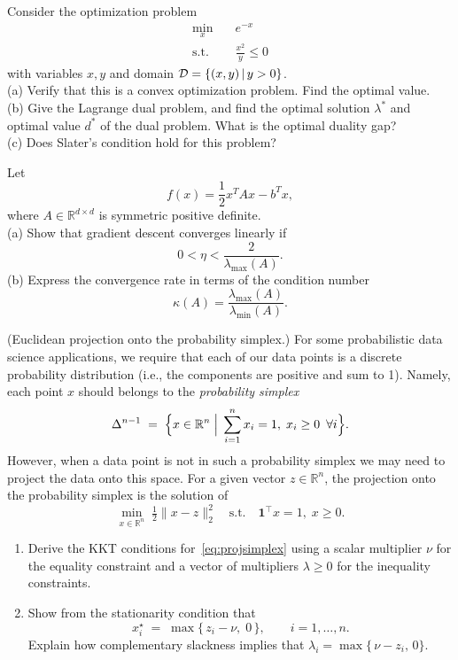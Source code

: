 \begin{myexercise}
Consider the optimization problem
\begin{align*}
 \min_x & \quad  e^{-x} \\
 \text{s.t.} & \quad \frac{x^2}{y} \le 0
\end{align*}
with variables $x,y$ and domain ${\mathcal D} = \{(x,y) \, | \, y >0\}$.\\
(a) Verify that this is a convex optimization problem. Find the optimal value. \\
(b) Give the Lagrange dual problem, and find the optimal solution $\lambda^*$ and optimal value $d^*$ of the dual problem. What is the optimal duality gap? \\
(c) Does Slater’s condition hold for this problem?    
\end{myexercise}

\begin{myexercise}
Let
$$
f(x) = \frac{1}{2} x^T A x - b^T x,
$$
where $A \in \mathbb{R}^{d \times d}$ is symmetric positive definite. \\
(a) Show that gradient descent converges linearly if
$$
0 < \eta < \frac{2}{\lambda_{\max}(A)}.
$$
(b) Express the convergence rate in terms of the condition number
$$
\kappa(A) = \frac{\lambda_{\max}(A)}{\lambda_{\min}(A)}.
$$    
\end{myexercise}

\begin{myexercise}
(Euclidean projection onto the probability simplex.) 
For some probabilistic data science applications, we require that each of our data points is a discrete probability distribution (i.e., the components are positive and sum to 1). Namely, each point $x$ should belongs to the {\em probability simplex}
$$
    \Delta^{n-1}\;=\;\Bigl\{x\in\mathbb{R}^{n}\;\Big|\;
                    \sum_{i=1}^{n} x_i = 1,\;x_i\ge 0 \,\,\,\forall i\Bigr\}.
$$
However, when a data point is not in such a probability simplex we may need to project the data onto this space.
For a given vector $z\in\mathbb{R}^{n}$, the projection onto the probability simplex is the solution of
\begin{equation}\label{eq:projsimplex} 
    \min_{x\in\mathbb{R}^{n}}\;
         \tfrac12\|x - z\|_{2}^{2}
    \quad\text{s.t.}\quad
         \mathbf{1}^{\top}x = 1,\;x\ge 0.
\end{equation}

\begin{enumerate}
\item  Derive the KKT conditions for~\eqref{eq:projsimplex} using a scalar multiplier  $\nu$ for the equality constraint and a vector of multipliers  $\lambda\ge 0$ for the inequality constraints.
\item  Show from the stationarity condition that
$$x^\star_i \;=\;\max\!\{\,z_i - \nu,\;0\,\},
                 \qquad i=1,\dots,n.$$
Explain how complementary slackness implies that $\lambda_i = \max\{\,\nu-z_i,\,0\}$.
\end{enumerate}
\end{myexercise}


